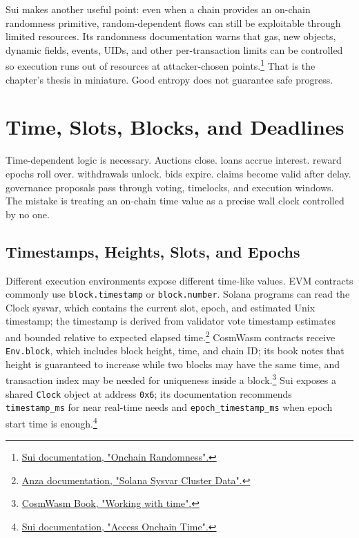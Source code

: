 Sui makes another useful point: even when a chain provides an on-chain randomness primitive, random-dependent flows can still be exploitable through limited resources. Its randomness documentation warns that gas, new objects, dynamic fields, events, UIDs, and other per-transaction limits can be controlled so execution runs out of resources at attacker-chosen points.\footnote{\href{https://docs.sui.io/sui-stack/on-chain-primitives/randomness-onchain}{Sui documentation, "Onchain Randomness".}} That is the chapter's thesis in miniature. Good entropy does not guarantee safe progress.

\section{Time, Slots, Blocks, and Deadlines}

Time-dependent logic is necessary. Auctions close. loans accrue interest. reward epochs roll over. withdrawals unlock. bids expire. claims become valid after delay. governance proposals pass through voting, timelocks, and execution windows. The mistake is treating an on-chain time value as a precise wall clock controlled by no one.

\subsection{Timestamps, Heights, Slots, and Epochs}

Different execution environments expose different time-like values. EVM contracts commonly use \texttt{block.timestamp} or \texttt{block.number}. Solana programs can read the Clock sysvar, which contains the current slot, epoch, and estimated Unix timestamp; the timestamp is derived from validator vote timestamp estimates and bounded relative to expected elapsed time.\footnote{\href{https://docs.anza.xyz/runtime/sysvars}{Anza documentation, "Solana Sysvar Cluster Data".}} CosmWasm contracts receive \texttt{Env.block}, which includes block height, time, and chain ID; its book notes that height is guaranteed to increase while two blocks may have the same time, and transaction index may be needed for uniqueness inside a block.\footnote{\href{https://book.cosmwasm.com/cross-contract/working-with-time.html}{CosmWasm Book, "Working with time".}} Sui exposes a shared \texttt{Clock} object at address \texttt{0x6}; its documentation recommends \texttt{timestamp\_ms} for near real-time needs and \texttt{epoch\_timestamp\_ms} when epoch start time is enough.\footnote{\href{https://docs.sui.io/sui-stack/on-chain-primitives/access-time}{Sui documentation, "Access Onchain Time".}}

